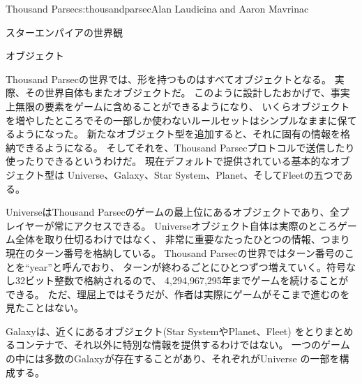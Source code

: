 \begin{aosachapter}{Thousand Parsec}{s:thousandparsec}{Alan Laudicina and Aaron Mavrinac}
\begin{aosasect1}{スターエンパイアの世界観}
\begin{aosasect2}{オブジェクト}

Thousand Parsecの世界では、形を持つものはすべてオブジェクトとなる。
実際、その世界自体もまたオブジェクトだ。
このように設計したおかげで、事実上無限の要素をゲームに含めることができるようになり、
いくらオブジェクトを増やしたところでその一部しか使わないルールセットはシンプルなままに保てるようになった。
新たなオブジェクト型を追加すると、それに固有の情報を格納できるようになる。
そしてそれを、Thousand Parsecプロトコルで送信したり使ったりできるというわけだ。
現在デフォルトで提供されている基本的なオブジェクト型は
Universe、Galaxy、Star System、Planet、そしてFleetの五つである。

UniverseはThousand Parsecのゲームの最上位にあるオブジェクトであり、全プレイヤーが常にアクセスできる。
Universeオブジェクト自体は実際のところゲーム全体を取り仕切るわけではなく、
非常に重要なたったひとつの情報、つまり現在のターン番号を格納している。
Thousand Parsecの世界ではターン番号のことを``year''と呼んでおり、
ターンが終わるごとにひとつずつ増えていく。符号なし32ビット整数で格納されるので、
4,294,967,295年までゲームを続けることができる。
ただ、理屈上ではそうだが、作者は実際にゲームがそこまで進むのを見たことはない。

Galaxyは、近くにあるオブジェクト(Star SystemやPlanet、Fleet)
をとりまとめるコンテナで、それ以外に特別な情報を提供するわけではない。
一つのゲームの中には多数のGalaxyが存在することがあり、それぞれがUniverse
の一部を構成する。


\end{aosasect2}
\end{aosasect1}
\end{aosachapter}
